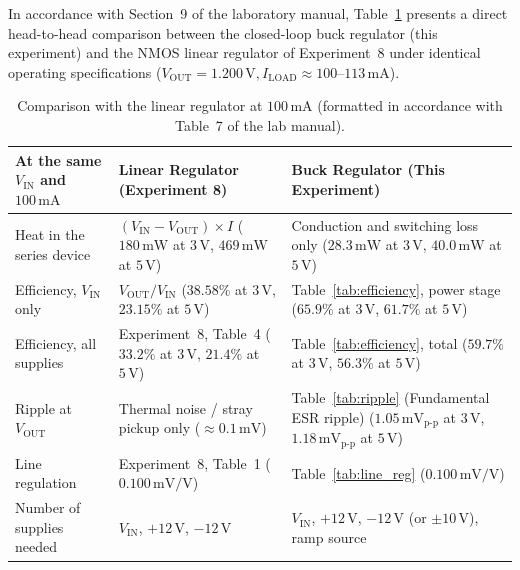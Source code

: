 \documentclass[11pt,a4paper]{article}
\begin{document}
In accordance with Section~9 of the laboratory manual, Table~\ref{tab:comparison} presents a direct head-to-head comparison between the closed-loop buck regulator (this experiment) and the NMOS linear regulator of Experiment~8 under identical operating specifications ($V_{\mathrm{OUT}} = 1.200\,\mathrm{V}, I_{\mathrm{LOAD}} \approx 100\text{--}113\,\mathrm{mA}$).

\begin{table}[H]
\centering
\caption{Comparison with the linear regulator at $100\,\mathrm{mA}$ (formatted in accordance with Table~7 of the lab manual).}
\label{tab:comparison}
\begin{tabular}{@{}p{3.8cm}p{5.8cm}p{6.4cm}@{}}
\toprule
\textbf{At the same $V_{\mathrm{IN}}$ and $100\,\mathrm{mA}$} & \textbf{Linear Regulator (Experiment 8)} & \textbf{Buck Regulator (This Experiment)} \\ \midrule
Heat in the series device & $(V_{\mathrm{IN}} - V_{\mathrm{OUT}}) \times I$ \newline ($180\,\mathrm{mW}$ at $3\,\mathrm{V}$, $469\,\mathrm{mW}$ at $5\,\mathrm{V}$) & Conduction and switching loss only \newline ($28.3\,\mathrm{mW}$ at $3\,\mathrm{V}$, $40.0\,\mathrm{mW}$ at $5\,\mathrm{V}$) \\ \addlinespace
Efficiency, $V_{\mathrm{IN}}$ only & $V_{\mathrm{OUT}} / V_{\mathrm{IN}}$ \newline ($38.58\%$ at $3\,\mathrm{V}$, $23.15\%$ at $5\,\mathrm{V}$) & Table~\ref{tab:efficiency}, power stage \newline ($\mathbf{65.9\%}$ at $3\,\mathrm{V}$, $\mathbf{61.7\%}$ at $5\,\mathrm{V}$) \\ \addlinespace
Efficiency, all supplies & Experiment~8, Table~4 \newline ($33.2\%$ at $3\,\mathrm{V}$, $21.4\%$ at $5\,\mathrm{V}$) & Table~\ref{tab:efficiency}, total \newline ($\mathbf{59.7\%}$ at $3\,\mathrm{V}$, $\mathbf{56.3\%}$ at $5\,\mathrm{V}$) \\ \addlinespace
Ripple at $V_{\mathrm{OUT}}$ & Thermal noise / stray pickup only \newline ($\approx 0.1\,\mathrm{mV}$) & Table~\ref{tab:ripple} (Fundamental ESR ripple) \newline ($\mathbf{1.05\,\mathrm{mV}_{\mathrm{p\text{-}p}}}$ at $3\,\mathrm{V}$, $\mathbf{1.18\,\mathrm{mV}_{\mathrm{p\text{-}p}}}$ at $5\,\mathrm{V}$) \\ \addlinespace
Line regulation & Experiment~8, Table~1 \newline ($0.100\,\mathrm{mV/V}$) & Table~\ref{tab:line_reg} \newline ($0.100\,\mathrm{mV/V}$) \\ \addlinespace
Number of supplies needed & $V_{\mathrm{IN}}$, $+12\,\mathrm{V}$, $-12\,\mathrm{V}$ & $V_{\mathrm{IN}}$, $+12\,\mathrm{V}$, $-12\,\mathrm{V}$ (or $\pm 10\,\mathrm{V}$), ramp source \\
\bottomrule
\end{tabular}
\end{table}
\end{document}
